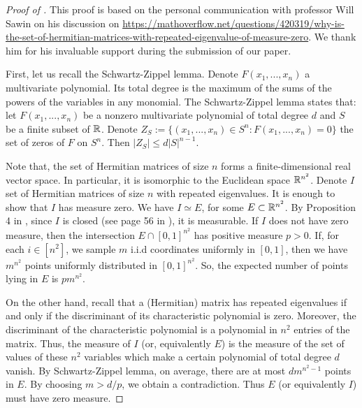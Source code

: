 \begin{proof}[Proof of ]
  This proof is based on the personal communication with professor Will Sawin
  on his discussion on \url{https://mathoverflow.net/questions/420319/why-is-the-set-of-hermitian-matrices-with-repeated-eigenvalue-of-measure-zero}.
  We thank him for his invaluable support during the submission of our paper.

  First, let us recall the Schwartz-Zippel lemma. Denote $F(x_1, ..., x_n)$ a multivariate polynomial.
  Its total degree is the maximum of the sums of the powers of the variables in any monomial.
  The Schwartz-Zippel lemma states that: let $F(x_1, ..., x_n)$ be a nonzero multivariate polynomial
  of total degree $d$ and $S$ be a finite subset of $\mathbb R$. Denote
  $Z_S := \{ (x_1, ..., x_n) \in S^n : F(x_1, ..., x_n) = 0 \}$ the set of zeros of $F$ on $S^n$.
  Then $| Z_S | \leq d |S|^{n-1}$.

  Note that, the set of Hermitian matrices of size $n$ forms a finite-dimensional real vector space.
  In particular, it is isomorphic to the Euclidean space $\mathbb R^{n^2}$.
  Denote $I$ set of Hermitian matrices of size $n$ with repeated eigenvalues.
  It is enough to show that $I$ has measure zero. We have $I \simeq E$,
  for some $E \subset \mathbb R^{n^2}$. By Proposition 4 in \citep{Stein05},
  since $I$ is closed (see page 56 in \citep{Tao12}), it is measurable.
  If $I$ does not have zero measure,
  then the intersection $E \cap [0, 1]^{n^2}$ has positive measure $p > 0$. If,
  for each $i \in [n^2]$, we sample $m$ i.i.d coordinates uniformly in $[0, 1]$,
  then we have $m^{n^2}$ points uniformly distributed in $[0, 1]^{n^2}$. So,
  the expected number of points lying in $E$ is $pm^{n^2}$.

  On the other hand, recall that a (Hermitian) matrix has repeated eigenvalues if and only if
  the discriminant of its characteristic polynomial is zero. Moreover,
  the discriminant of the characteristic polynomial is a polynomial in $n^2$ entries of the matrix.
  Thus, the measure of $I$ (or, equivalently $E$) is the measure of the set of values of these
  $n^2$ variables which make a certain polynomial of total degree $d$ vanish.
  By Schwartz-Zippel lemma, on average, there are at most $d m^{n^2-1}$ points in $E$.
  By choosing $m > d / p$, we obtain a contradiction. Thus $E$ (or equivalently $I$)
  must have zero measure.
\end{proof}

